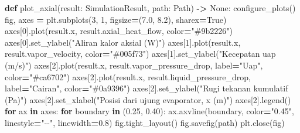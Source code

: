 \documentclass[
  12pt,a4paper,oneside]{report}
\newenvironment{Shaded}{\begin{snugshade}}{\end{snugshade}}
\newcommand{\ControlFlowTok}[1]{\textcolor[rgb]{0.13,0.29,0.53}{\textbf{#1}}}
\newcommand{\DecValTok}[1]{\textcolor[rgb]{0.00,0.00,0.81}{#1}}
\newcommand{\FloatTok}[1]{\textcolor[rgb]{0.00,0.00,0.81}{#1}}
\newcommand{\KeywordTok}[1]{\textcolor[rgb]{0.13,0.29,0.53}{\textbf{#1}}}
\newcommand{\NormalTok}[1]{#1}
\newcommand{\OperatorTok}[1]{\textcolor[rgb]{0.81,0.36,0.00}{\textbf{#1}}}
\newcommand{\StringTok}[1]{\textcolor[rgb]{0.31,0.60,0.02}{#1}}
\newcommand{\VariableTok}[1]{\textcolor[rgb]{0.00,0.00,0.00}{#1}}
\begin{document}
\begin{Shaded}
\begin{Highlighting}[]
\KeywordTok{def}\NormalTok{ plot\_axial(result: SimulationResult, path: Path) }\OperatorTok{{-}\textgreater{}} \VariableTok{None}\NormalTok{:}
\NormalTok{    configure\_plots()}
\NormalTok{    fig, axes }\OperatorTok{=}\NormalTok{ plt.subplots(}\DecValTok{3}\NormalTok{, }\DecValTok{1}\NormalTok{, figsize}\OperatorTok{=}\NormalTok{(}\FloatTok{7.0}\NormalTok{, }\FloatTok{8.2}\NormalTok{), sharex}\OperatorTok{=}\VariableTok{True}\NormalTok{)}
\NormalTok{    axes[}\DecValTok{0}\NormalTok{].plot(result.x, result.axial\_heat\_flow, color}\OperatorTok{=}\StringTok{"\#9b2226"}\NormalTok{)}
\NormalTok{    axes[}\DecValTok{0}\NormalTok{].set\_ylabel(}\StringTok{"Aliran kalor aksial (W)"}\NormalTok{)}
\NormalTok{    axes[}\DecValTok{1}\NormalTok{].plot(result.x, result.vapor\_velocity, color}\OperatorTok{=}\StringTok{"\#005f73"}\NormalTok{)}
\NormalTok{    axes[}\DecValTok{1}\NormalTok{].set\_ylabel(}\StringTok{"Kecepatan uap (m/s)"}\NormalTok{)}
\NormalTok{    axes[}\DecValTok{2}\NormalTok{].plot(result.x, result.vapor\_pressure\_drop, label}\OperatorTok{=}\StringTok{"Uap"}\NormalTok{, color}\OperatorTok{=}\StringTok{"\#ca6702"}\NormalTok{)}
\NormalTok{    axes[}\DecValTok{2}\NormalTok{].plot(result.x, result.liquid\_pressure\_drop, label}\OperatorTok{=}\StringTok{"Cairan"}\NormalTok{, color}\OperatorTok{=}\StringTok{"\#0a9396"}\NormalTok{)}
\NormalTok{    axes[}\DecValTok{2}\NormalTok{].set\_ylabel(}\StringTok{"Rugi tekanan kumulatif (Pa)"}\NormalTok{)}
\NormalTok{    axes[}\DecValTok{2}\NormalTok{].set\_xlabel(}\StringTok{"Posisi dari ujung evaporator, x (m)"}\NormalTok{)}
\NormalTok{    axes[}\DecValTok{2}\NormalTok{].legend()}
    \ControlFlowTok{for}\NormalTok{ ax }\KeywordTok{in}\NormalTok{ axes:}
        \ControlFlowTok{for}\NormalTok{ boundary }\KeywordTok{in}\NormalTok{ (}\FloatTok{0.25}\NormalTok{, }\FloatTok{0.40}\NormalTok{):}
\NormalTok{            ax.axvline(boundary, color}\OperatorTok{=}\StringTok{"0.45"}\NormalTok{, linestyle}\OperatorTok{=}\StringTok{"{-}{-}"}\NormalTok{, linewidth}\OperatorTok{=}\FloatTok{0.8}\NormalTok{)}
\NormalTok{    fig.tight\_layout()}
\NormalTok{    fig.savefig(path)}
\NormalTok{    plt.close(fig)}



\end{Highlighting}
\end{Shaded}
\end{document}
